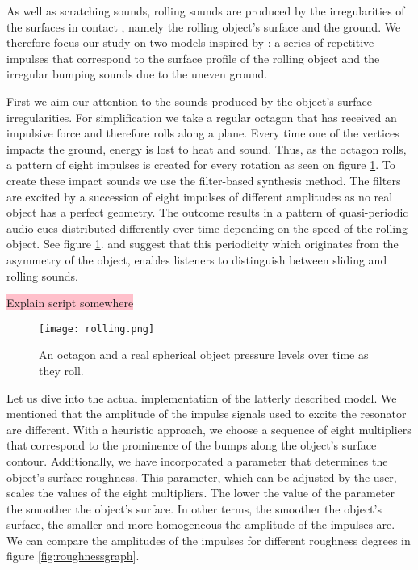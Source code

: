 As well as scratching sounds, rolling sounds are produced by the irregularities of the surfaces in contact \cite{van2001foleyautomatic}, namely the rolling object's surface and the ground. We therefore focus our study on two models inspired by \cite{farnell2010designing}: a series of repetitive impulses that correspond to the surface profile of the rolling object and the irregular bumping sounds due to the uneven ground.

First we aim our attention to the sounds produced by the object's surface irregularities. For simplification we take a regular octagon that has received an impulsive force and therefore rolls along a plane. Every time one of the vertices impacts the ground, energy is lost to heat and sound. Thus, as the octagon rolls, a pattern of eight impulses is created for every rotation as seen on figure \ref{fig:rolling}. To create these impact sounds we use the filter-based synthesis method. The filters are excited by a succession of eight impulses of different amplitudes as no real object has a perfect geometry. The outcome results in a pattern of quasi-periodic audio cues distributed differently over time depending on the speed of the rolling object. See figure \ref{fig:rolling}. \cite{houben1999auditory} and \cite{rath2003expressive} suggest that this periodicity which originates from the asymmetry of the object, enables listeners to distinguish between sliding and rolling sounds.

\colorbox{pink}{Explain script somewhere}

\begin{figure}[H]
  \centering
    \texttt{[image: rolling.png]}
      \caption{An octagon and a real spherical object pressure levels over time as they roll.}
      \label{fig:rolling}
\end{figure} 

Let us dive into the actual implementation of the latterly described model. We mentioned that the amplitude of the impulse signals used to excite the resonator are different. With a heuristic approach, we choose a sequence of eight multipliers that correspond to the prominence of the bumps along the object's surface contour. Additionally, we have incorporated a parameter that determines the object's surface roughness. This parameter, which can be adjusted by the user, scales the values of the eight multipliers. The lower the value of the parameter the smoother the object's surface. In other terms, the smoother the object's surface, the smaller and more homogeneous the amplitude of the impulses are. We can compare the amplitudes of the impulses for different roughness degrees in figure  \ref{fig:roughnessgraph}.

